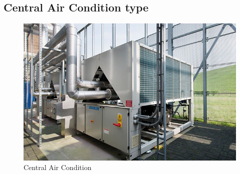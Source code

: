 \documentclass[12pt,fleqn]{book} %
\begin{document}
\subsection{ Central Air Condition type}
\begin{figure}[h!]
    \centering
    \includegraphics[width=1\linewidth]{h 2.png}
    \caption{ Central Air Condition  }
    \label{fig:h 2}
\end{figure}
\end{document}
